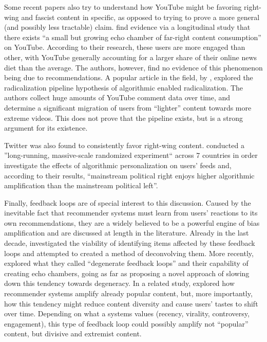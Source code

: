 Some recent papers also try to understand how YouTube might be favoring
right-wing and fascist content in specific, as opposed to trying to prove a more
general (and possibly less tractable) claim.
\citet{hosseinmardi_evaluating_2020} find evidence via a longitudinal study that
there exists ``a small but growing echo chamber of far-right content
consumption'' on YouTube. According to their research, these users are more
engaged than other, with YouTube generally accounting for a larger share of
their online news diet than the average. The authors, however, find no evidence
of this phenomenon being due to recommendations. A popular article in the field,
by \citet{ribeiro_auditing_2020}, explored the radicalization pipeline
hypothesis of algorithmic enabled radicalization. The authors collect huge
amounts of YouTube comment data over time, and determine a significant migration
of users from ``lighter'' content towards more extreme videos. This does not
prove that the pipeline exists, but is a strong argument for its existence.

Twitter was also found to consistently favor right-wing content.
\citet{huszar_algorithmic_2021} conducted a ''long-running, massive-scale
randomized experiment`` across 7 countries in order investigate the effects of
algorithmic personalization on users' feeds and, according to their results,
``mainstream political right enjoys higher algorithmic amplification than the
mainstream political left''.

Finally, feedback loops are of special interest to this discussion. Caused by
the inevitable fact that recommender systems must learn from users' reactions to
its own recommendations, they are a widely believed to be a powerful engine of
bias amplification and are discussed at length in the literature. Already in the
last decade, \citet{sinha_deconvolving_2017} investigated the viability of
identifying items affected by these feedback loops and attempted to created a
method of deconvolving them. More recently, \citet{jiang_degenerate_2019}
explored what they called ``degenerate feedback loops'' and their capability of
creating echo chambers, going as far as proposing a novel approach of slowing
down this tendency towards degeneracy. In a related study,
\citet{mansoury_feedback_2020} explored how recommender systems amplify already
popular content, but, more importantly, how this tendency might reduce content
diversity and cause users' tastes to shift over time. Depending on what a
systems values (recency, virality, controversy, engagement), this type of
feedback loop could possibly amplify not ``popular'' content, but divisive and
extremist content.

